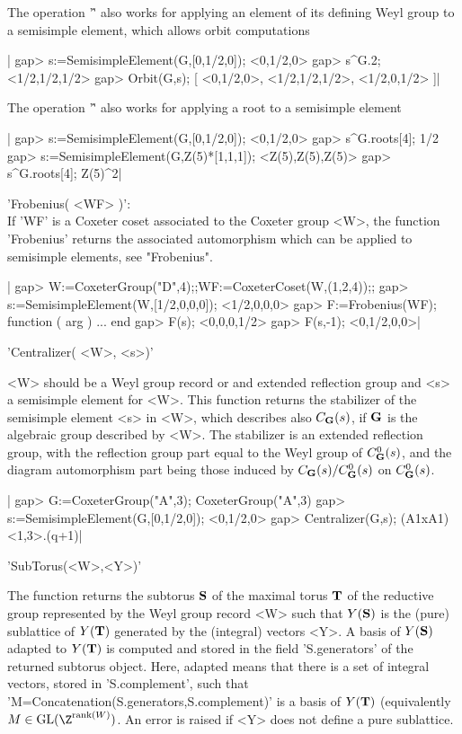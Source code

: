 The operation '\^' also works for applying an element of its defining Weyl
group to a semisimple element, which allows orbit computations\:

|    gap> s:=SemisimpleElement(G,[0,1/2,0]);
    <0,1/2,0>
    gap> s^G.2;
    <1/2,1/2,1/2>
    gap> Orbit(G,s);
    [ <0,1/2,0>, <1/2,1/2,1/2>, <1/2,0,1/2> ]|

The operation '\^' also works for applying a root to a semisimple element\:

|    gap> s:=SemisimpleElement(G,[0,1/2,0]);
    <0,1/2,0>
    gap> s^G.roots[4];
    1/2
    gap> s:=SemisimpleElement(G,Z(5)*[1,1,1]);
    <Z(5),Z(5),Z(5)>
    gap> s^G.roots[4];
    Z(5)^2|

'Frobenius(  <WF> )':\\ If  'WF' is a  Coxeter coset associated to the
Coxeter   group  <W>,  the  function  'Frobenius'  returns  the  associated
automorphism which can be applied to semisimple elements, see "Frobenius".

|    gap> W:=CoxeterGroup("D",4);;WF:=CoxeterCoset(W,(1,2,4));;
    gap> s:=SemisimpleElement(W,[1/2,0,0,0]);
    <1/2,0,0,0>
    gap> F:=Frobenius(WF);
    function ( arg ) ... end
    gap> F(s);
    <0,0,0,1/2>
    gap> F(s,-1);
    <0,1/2,0,0>|


'Centralizer( <W>, <s>)'

<W>  should be a Weyl group record or and extended reflection group and <s>
a  semisimple element for <W>. This  function returns the stabilizer of the
semisimple element <s> in <W>, which describes also $C_{\mathbf G}(s)$, if ${\mathbf G}$ is
the  algebraic  group  described  by  <W>.  The  stabilizer  is an extended
reflection group, with the reflection group part equal to the Weyl group of
$C_{\mathbf G}^0(s)$,  and  the  diagram  automorphism  part being those induced by
$C_{\mathbf G}(s)/C_{\mathbf G}^0(s)$ on $C_{\mathbf G}^0(s)$.

|    gap> G:=CoxeterGroup("A",3);
    CoxeterGroup("A",3)
    gap> s:=SemisimpleElement(G,[0,1/2,0]);
    <0,1/2,0>
    gap> Centralizer(G,s);
    (A1xA1)<1,3>.(q+1)|


'SubTorus(<W>,<Y>)'

The  function returns the subtorus ${\mathbf S}$ of  the maximal torus ${\mathbf T}$ of the
reductive group represented by the Weyl group record <W> such that $Y({\mathbf S})$
is  the (pure) sublattice  of $Y({\mathbf T})$ generated  by the (integral) vectors
<Y>.  A basis of $Y({\mathbf S})$ adapted to $Y({\mathbf T})$ is computed and stored in the
field  'S.generators' of the returned  subtorus object. Here, adapted means
that  there is  a set  of integral  vectors, stored in 'S.complement', such
that  'M\:=Concatenation(S.generators,S.complement)' is a basis of $Y({\mathbf T})$
(equivalently  $M\in\text{GL}(\Z^{\text{rank}(W)})$. An error  is raised if
<Y> does not define a pure sublattice.

